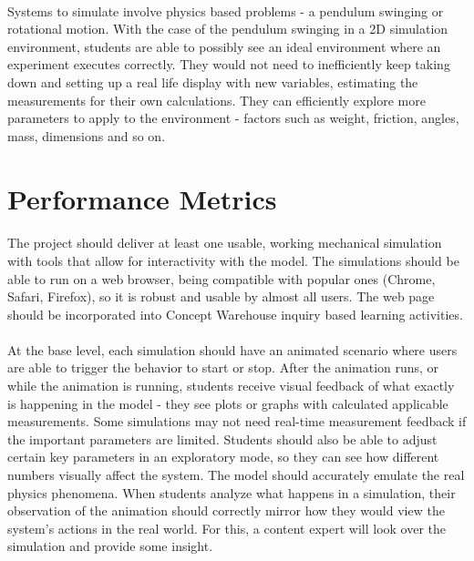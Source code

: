 \documentclass[10pt]{article}
\begin{document}
\paragraph{}Systems to simulate involve physics based problems - a pendulum swinging or rotational motion. With the case of the pendulum swinging in a 2D simulation environment, students are able to possibly see an ideal environment where an experiment executes correctly. They would not need to inefficiently keep taking down and setting up a real life display with new variables, estimating the measurements for their own calculations. They can efficiently explore more parameters to apply to the environment - factors such as weight, friction, angles, mass, dimensions and so on.




\section{Performance Metrics}
\paragraph{}The project should deliver at least one usable, working mechanical simulation with tools that allow for interactivity with the model. The simulations should be able to run on a web browser, being compatible with popular ones (Chrome, Safari, Firefox), so it is robust and usable by almost all users. The web page should be incorporated into Concept Warehouse inquiry based learning activities. 

\paragraph{}At the base level, each simulation should have an animated scenario where users are able to trigger the behavior to start or stop. After the animation runs, or while the animation is running, students receive visual feedback of what exactly is happening in the model - they see plots or graphs with calculated applicable measurements. Some simulations may not need real-time measurement feedback if the important parameters are limited. Students should also be able to adjust certain key parameters in an exploratory mode, so they can see how different numbers visually affect the system. The model should accurately emulate the real physics phenomena. When students analyze what happens in a simulation, their observation of the animation should correctly mirror how they would view the system's actions in the real world. For this, a content expert will look over the simulation and provide some insight.
\end{document}
